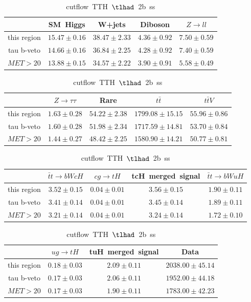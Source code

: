\begin{table}
\caption{cutflow~TTH~$\tlhad$~2b~ss}
\centering
\begin{tabular}{|c|c|c|c|c|} \hline
 & SM~Higgs & W+jets & Diboson & $Z\to ll$\\\hline
this region & $15.47\pm0.16$ & $38.47\pm2.33$ & $4.36\pm0.92$ & $7.50\pm0.59$\\\hline
tau b-veto & $14.66\pm0.16$ & $36.84\pm2.25$ & $4.28\pm0.92$ & $7.40\pm0.59$\\\hline
$MET>20$ & $13.88\pm0.15$ & $34.57\pm2.22$ & $3.90\pm0.91$ & $5.58\pm0.49$\\\hline
\end{tabular}
\begin{tabular}{|c|c|c|c|c|} \hline
 & $Z\to \tau\tau$ & Rare & $t\bar{t}$ & $t\bar{t}V$\\\hline
this region & $1.63\pm0.28$ & $54.22\pm2.38$ & $1799.08\pm15.15$ & $55.96\pm0.86$\\\hline
tau b-veto & $1.60\pm0.28$ & $51.98\pm2.34$ & $1717.59\pm14.81$ & $53.70\pm0.84$\\\hline
$MET>20$ & $1.44\pm0.27$ & $48.42\pm2.25$ & $1580.90\pm14.21$ & $50.77\pm0.81$\\\hline
\end{tabular}
\begin{tabular}{|c|c|c|c|c|} \hline
 & $\bar{t}t\to bWcH$ & $cg\to tH$ & tcH~merged~signal & $\bar{t}t\to bWuH$\\\hline
this region & $3.52\pm0.15$ & $0.04\pm0.01$ & $3.56\pm0.15$ & $1.90\pm0.11$\\\hline
tau b-veto & $3.41\pm0.14$ & $0.04\pm0.01$ & $3.45\pm0.14$ & $1.89\pm0.11$\\\hline
$MET>20$ & $3.21\pm0.14$ & $0.04\pm0.01$ & $3.24\pm0.14$ & $1.72\pm0.10$\\\hline
\end{tabular}
\begin{tabular}{|c|c|c|c|} \hline
 & $ug\to tH$ & tuH~merged~signal & Data\\\hline
this region & $0.18\pm0.03$ & $2.09\pm0.11$ & $2038.00\pm45.14$\\\hline
tau b-veto & $0.17\pm0.03$ & $2.06\pm0.11$ & $1952.00\pm44.18$\\\hline
$MET>20$ & $0.17\pm0.03$ & $1.90\pm0.11$ & $1783.00\pm42.23$\\\hline
\end{tabular}
\label{tab:cutflow_reg1l1tau2b3j_ss}
\end{table}
